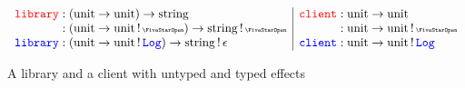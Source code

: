 \newcommand\ruledef{::=}
\newcommand\rulealt{\;|\;}
\newcommand\tyarr[2]{#1 \to #2}
\newcommand\tyany{\star}
\newcommand\cty[2]{#2 ! #1}
\newcommand\tynat{\mathrm{nat}}
\newcommand\tybool{\mathrm{bool}}
\newcommand\tyunit{\mathrm{unit}}
\newcommand\tystring{\mathrm{string}}
\newcommand\effany{\mbox{\tiny\FiveStarOpen}}
\newcommand\effop{\mathit{op}}
\newcommand\app[2]{#1\,#2}
\newcommand\lam[2]{\lambda\, #1 .\, #2}
\newcommand\cast[2]{#1 \,\MVAt\, #2}
\newcommand\tbox[2]{#1 \Uparrow #2}
\newcommand\blame{\mathrm{blame}}
\newcommand\perform[2]{#1\left(#2\right)}
\newcommand\handle[2]{\mathbf{handle}\,\{#1\}\,#2}
\newcommand\fori[3]{(#3)_{#1=1\dots #2}}
\newcommand\foriset[3]{\{#3\}_{#1=1\dots #2}}
\newcommand\treturn[1]{\mathbf{return}\,#1}
\newcommand\stepto{\rightsquigarrow}
\newcommand\stepsto{\stepto^\ast}
\newcommand\subst[3]{#1[#2/#3]}
\newcommand\context[2]{#1[#2]}
\newcommand\xC{\mathcal{C}}
\newcommand\xE{\mathcal{E}}
\newcommand\xP{\mathcal{P}}
\newcommand\bound[1]{\mathbf{bound}(#1)}
\newcommand\cid{\mathrm{id}}
\newcommand\commutel[3]{\mathbf{commutes}^l(#1,#2,#3)}
\newcommand\commuter[3]{\mathbf{commutes}^r(#1,#2,#3)}
\newcommand\cod[1]{\mathrm{cod}(#1)}
\newcommand\codeff[1]{\mathrm{eff}(#1)}
\newcommand\dom[1]{\mathrm{dom}(#1)}
\newcommand\typeof[1]{\mathrm{typeof}(#1)}
\newcommand\dprime{{\prime\prime}}

\newcommand\Term[3]{#1 \vdash #2 : #3}
\newcommand\TermP[4]{#1 \vdash #2 \le #3 : #4}

\newcommand\dhandler{{\color{red}\texttt{library}}}
\newcommand\shandler{{\color{blue}\texttt{library}}}
\newcommand\dclient{{\color{red}\texttt{client}}}
\newcommand\sclient{{\color{blue}\texttt{client}}}

\newcommand\eflog{{\color{blue}\texttt{Log}}}
\newcommand\efnone{\epsilon}

\begin{figure}
$$
\begin{array}{l|l}
  \dhandler : (\tyunit \to \tyunit) \to \tystring & \dclient : \tyunit \to \tyunit \\
  \hphantom{\dhandler} : (\tyunit \to \tyunit\,!\,\effany) \to \tystring\,!\,\effany & \hphantom{\dclient} : \tyunit \to \tyunit\,!\,\effany \\
  \shandler : (\tyunit \to \tyunit\,!\,\eflog) \to \tystring \,!\, \epsilon & \sclient : \tyunit \to \tyunit\,!\,\eflog
\end{array}
$$
\caption{A library and a client with {\color{red}untyped} and {\color{blue}typed} effects}
\label{fig:app-example}
\end{figure}


